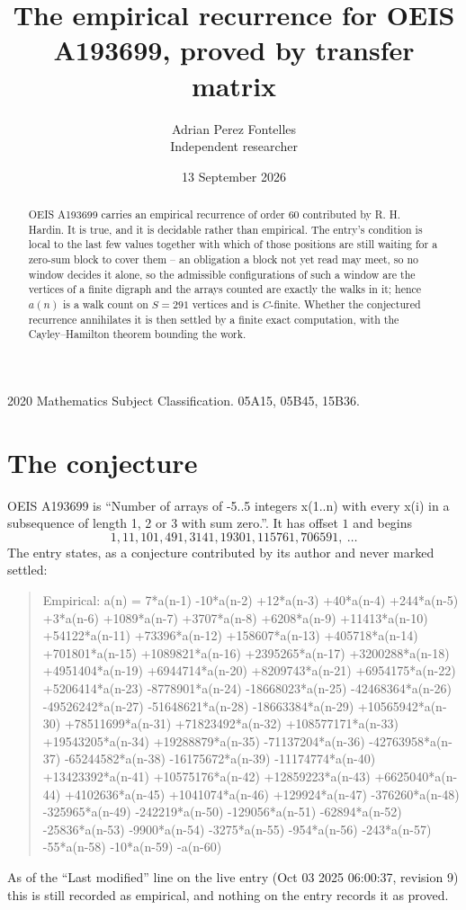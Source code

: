 \documentclass[11pt,a4paper]{article}
\title{The empirical recurrence for OEIS A193699, proved by transfer matrix}
\author{Adrian Perez Fontelles\\ \small Independent researcher}
\date{13 September 2026}
\theoremstyle{plain}
\theoremstyle{definition}
\begin{document}
\maketitle

\begin{abstract}
OEIS A193699 carries an empirical recurrence of order $60$ contributed by R. H. Hardin. It is
true, and it is decidable rather than empirical. The entry's condition is local to the last few values together with which of those positions are still waiting for a zero-sum block to cover them -- an obligation a block not yet read may meet, so no window decides it alone, so
the admissible configurations of such a window are the vertices of a finite digraph and the
arrays counted are exactly the walks in it; hence $a(n)$ is a walk count on $S=291$ vertices
and is $C$-finite. Whether the conjectured recurrence annihilates it is then settled by a
finite exact computation, with the Cayley--Hamilton theorem bounding the work.
\end{abstract}

\noindent\small 2020 Mathematics Subject Classification. 05A15, 05B45, 15B36.\normalsize

\section{The conjecture}

OEIS A193699 is ``Number of arrays of -5..5 integers x(1..n) with every x(i) in a subsequence of length 1, 2 or 3 with sum zero.''. It has offset $1$ and begins
\[
1, 11, 101, 491, 3141, 19301, 115761, 706591,\ \dots
\]
The entry states, as a conjecture contributed by its author and never marked settled:
\begin{quote}
Empirical: a(n) = 7*a(n-1) -10*a(n-2) +12*a(n-3) +40*a(n-4) +244*a(n-5) +3*a(n-6) +1089*a(n-7) +3707*a(n-8) +6208*a(n-9) +11413*a(n-10) +54122*a(n-11) +73396*a(n-12) +158607*a(n-13) +405718*a(n-14) +701801*a(n-15) +1089821*a(n-16) +2395265*a(n-17) +3200288*a(n-18) +4951404*a(n-19) +6944714*a(n-20) +8209743*a(n-21) +6954175*a(n-22) +5206414*a(n-23) -8778901*a(n-24) -18668023*a(n-25) -42468364*a(n-26) -49526242*a(n-27) -51648621*a(n-28) -18663384*a(n-29) +10565942*a(n-30) +78511699*a(n-31) +71823492*a(n-32) +108577171*a(n-33) +19543205*a(n-34) +19288879*a(n-35) -71137204*a(n-36) -42763958*a(n-37) -65244582*a(n-38) -16175672*a(n-39) -11174774*a(n-40) +13423392*a(n-41) +10575176*a(n-42) +12859223*a(n-43) +6625040*a(n-44) +4102636*a(n-45) +1041074*a(n-46) +129924*a(n-47) -376260*a(n-48) -325965*a(n-49) -242219*a(n-50) -129056*a(n-51) -62894*a(n-52) -25836*a(n-53) -9900*a(n-54) -3275*a(n-55) -954*a(n-56) -243*a(n-57) -55*a(n-58) -10*a(n-59) -a(n-60)
\end{quote}
As of the ``Last modified'' line on the live entry (Oct 03 2025 06:00:37, revision 9) this is still
recorded as empirical, and nothing on the entry records it as proved.
\end{document}
